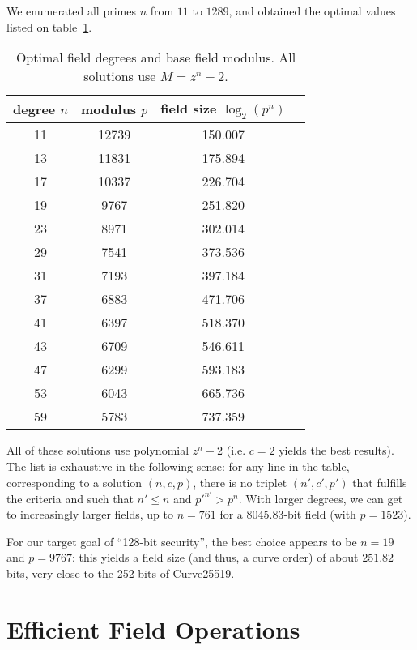 \documentclass{llncs}
\begin{document}
We enumerated all primes $n$ from $11$ to $1289$, and obtained the
optimal values listed on table~\ref{tab:degree-modulus}.
\begin{table}
\begin{center}
    \begin{tabular}{|c|c|c|c|}
        \hline
        degree $n$ & modulus $p$ & field size $\log_2(p^n)$ \\
        \hline
        11 & 12739 & 150.007 \\
        13 & 11831 & 175.894 \\
        17 & 10337 & 226.704 \\
        19 &  9767 & 251.820 \\
        23 &  8971 & 302.014 \\
        29 &  7541 & 373.536 \\
        31 &  7193 & 397.184 \\
        37 &  6883 & 471.706 \\
        41 &  6397 & 518.370 \\
        43 &  6709 & 546.611 \\
        47 &  6299 & 593.183 \\
        53 &  6043 & 665.736 \\
        59 &  5783 & 737.359 \\
        \hline
    \end{tabular}
\end{center}
\caption{\label{tab:degree-modulus}Optimal field degrees and base field
modulus. All solutions use $M = z^n-2$.}
\end{table}

All of these solutions use polynomial $z^n-2$ (i.e. $c = 2$ yields the
best results). The list is exhaustive in the following sense: for any
line in the table, corresponding to a solution $(n,c,p)$, there is no
triplet $(n',c',p')$ that fulfills the criteria and such that $n' \leq
n$ and $p'^{n'} > p^n$. With larger degrees, we can get to increasingly
larger fields, up to $n = 761$ for a $8045.83$-bit field (with $p =
1523$).

For our target goal of ``128-bit security'', the best choice appears
to be $n = 19$ and $p = 9767$: this yields a field size (and thus,
a curve order) of about $251.82$ bits, very close to the 252 bits of
Curve25519.

\section{Efficient Field Operations}\label{sec:field-ops}
\end{document}
